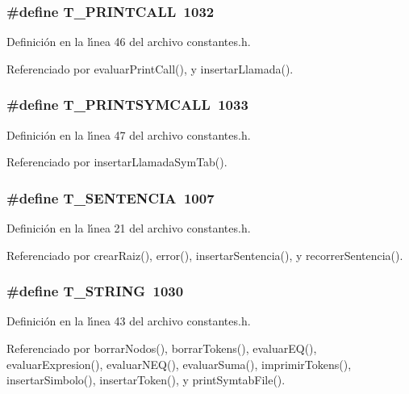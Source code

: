 \subsubsection{\setlength{\rightskip}{0pt plus 5cm}\#define T\_\-PRINTCALL~1032}\label{constantes_8h_a34}




Definici\'{o}n en la l\'{\i}nea 46 del archivo constantes.h.

Referenciado por evaluar\-Print\-Call(), y insertar\-Llamada().
\subsubsection{\setlength{\rightskip}{0pt plus 5cm}\#define T\_\-PRINTSYMCALL~1033}\label{constantes_8h_a35}




Definici\'{o}n en la l\'{\i}nea 47 del archivo constantes.h.

Referenciado por insertar\-Llamada\-Sym\-Tab().
\subsubsection{\setlength{\rightskip}{0pt plus 5cm}\#define T\_\-SENTENCIA~1007}\label{constantes_8h_a10}




Definici\'{o}n en la l\'{\i}nea 21 del archivo constantes.h.

Referenciado por crear\-Raiz(), error(), insertar\-Sentencia(), y recorrer\-Sentencia().
\subsubsection{\setlength{\rightskip}{0pt plus 5cm}\#define T\_\-STRING~1030}\label{constantes_8h_a32}




Definici\'{o}n en la l\'{\i}nea 43 del archivo constantes.h.

Referenciado por borrar\-Nodos(), borrar\-Tokens(), evaluar\-EQ(), evaluar\-Expresion(), evaluar\-NEQ(), evaluar\-Suma(), imprimir\-Tokens(), insertar\-Simbolo(), insertar\-Token(), y print\-Symtab\-File().
